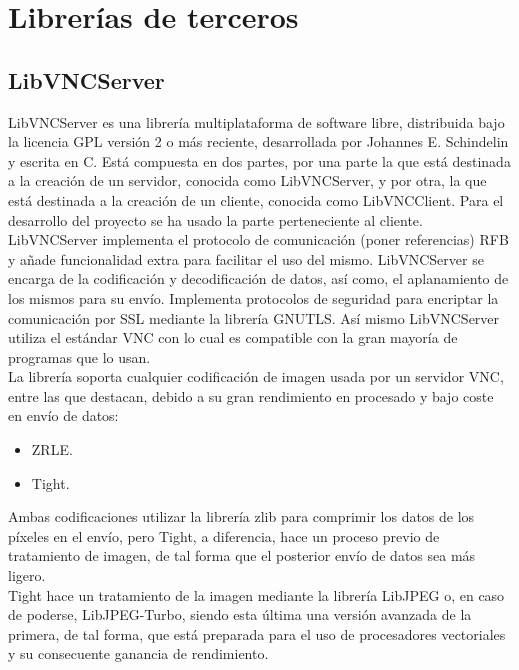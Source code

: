 \section{Librerías de terceros}
\subsection{LibVNCServer}
LibVNCServer es una librería multiplataforma de software libre, distribuida bajo la licencia GPL versión 2 o más reciente, desarrollada por Johannes E. Schindelin y escrita en C. Está compuesta en dos partes, por una parte la que está destinada a la creación de un servidor, conocida como LibVNCServer, y por otra, la que está destinada a la creación de un cliente, conocida como LibVNCClient. Para el desarrollo del proyecto se ha usado la parte perteneciente al cliente.\\

LibVNCServer implementa el protocolo de comunicación (poner referencias) RFB y añade funcionalidad extra para facilitar el uso del mismo. LibVNCServer se encarga de la codificación y decodificación de datos, así como, el aplanamiento de los mismos para su envío. Implementa protocolos de seguridad para encriptar la comunicación por SSL mediante la librería GNUTLS. Así mismo LibVNCServer utiliza el estándar VNC con lo cual es compatible con la gran mayoría de programas que lo usan.\\

La librería soporta cualquier codificación de imagen usada por un servidor VNC, entre las que destacan, debido a su gran rendimiento en procesado y bajo coste en envío de datos:\\
\begin{itemize}
\item ZRLE.
\item Tight.\\
\end{itemize}

Ambas codificaciones utilizar la librería zlib para comprimir los datos de los píxeles en el envío, pero Tight, a diferencia, hace un proceso previo de tratamiento de imagen, de tal forma que el posterior envío de datos sea más ligero.\\

Tight hace un tratamiento de la imagen mediante la librería LibJPEG o, en caso de poderse, LibJPEG-Turbo, siendo esta última una versión avanzada de la primera, de tal forma, que está preparada para el uso de procesadores vectoriales y su consecuente ganancia de rendimiento.\\


